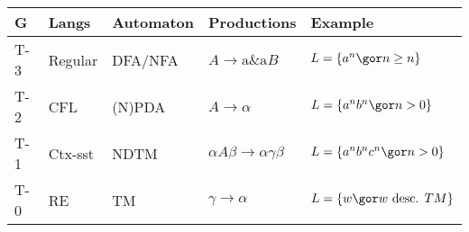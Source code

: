 {\footnotesize
\begin{tabular}{lp{1cm}p{1.2cm}ll}
  \hline
  G & Langs & Automaton & Productions & Example \\
  \hline
  T-3  & Regular    & DFA/NFA        & \(A \rightarrow \text{a} \& \text{a}B\) & \(L = \{a^{n}\gor n\geq n\}\)\\
  T-2  & CFL   & (N)PDA     & \(A \rightarrow \alpha\) & \(L = \{a^{n}b^{n}\gor n>0\}\)\\
  \textcolor{dmm}{T-1}  & \textcolor{dmm}{Ctx-sst} & \textcolor{dmm}{NDTM} & \textcolor{dmm}{\(\alpha A\beta \rightarrow \alpha\gamma\beta\)} & \textcolor{dmm}{\(L = \{a^{n}b^{n}c^{n}\gor n>0\}\)}\\
  T-0  & RE    & TM        & \(\gamma \rightarrow \alpha\) & \(L = \{w\gor w \text{ desc. } TM\}\)\\
\hline
\end{tabular}
}
